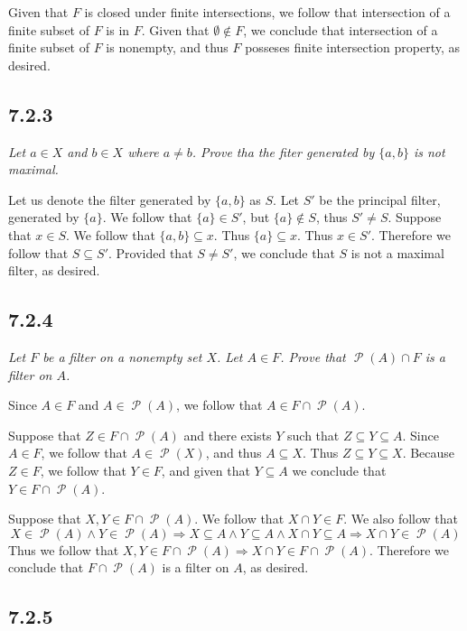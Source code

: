 \documentclass[11pt,oneside,titlepage]{book}
\DeclareMathOperator \pow {\mathcal {P}}
\DeclareMathOperator \ra {\Rightarrow}
\newcommand{\set}[1]{\{ #1 \}}
\begin{document}
Given that $F$ is closed under finite intersections, we follow that intersection of
a finite subset of $F$ is in $F$. Given that $\emptyset \notin F$, we conclude that
intersection of a finite subset of $F$ is nonempty, and thus $F$ posseses finite
intersection property, as desired.

\subsection*{7.2.3}

\textit{Let $a \in X$ and $b \in X$ where $a \neq b$. Prove tha the fiter generated by
  $\set{a, b}$ is not maximal.}

Let us denote the filter generated by $\set{a, b}$ as $S$.
Let $S'$ be the principal filter, generated by $\set{a}$. We follow that $\set{a} \in S'$,
but $\set{a} \notin S$, thus $S' \neq S$. Suppose that $x \in S$. We follow that
$\set{a, b} \subseteq x$. Thus $\set{a} \subseteq x$. Thus $x \in S'$. Therefore we follow that
$S \subseteq S'$. Provided that $S \neq S'$, we conclude that $S$ is not a maximal filter, as
desired.

\subsection*{7.2.4}

\textit{Let $F$ be a filter on a nonempty set $X$. Let $A \in F$. Prove that $\pow(A) \cap F$
  is a filter on $A$.}

Since $A \in F$ and $A \in \pow(A)$, we follow that $A \in F \cap \pow(A)$.

Suppose that $Z \in F \cap \pow(A)$ and there exists $Y$ such that
$Z \subseteq Y \subseteq A$. Since $A \in F$, we follow
that $A \in \pow(X)$, and thus $A \subseteq X$. Thus $Z \subseteq Y \subseteq X$.
Because $Z \in F$, we follow that $Y \in F$, and given that $Y \subseteq A$ we conclude that
$Y \in F \cap \pow(A)$.

Suppose that $X, Y \in F \cap \pow(A)$. We follow that $X \cap Y \in F$. We also follow that
$$X \in \pow(A) \land Y \in \pow(A) \ra
X \subseteq A \land Y \subseteq A \land X \cap Y \subseteq A \ra
X \cap Y \in \pow(A)$$
Thus we follow that $X, Y \in F \cap \pow(A) \ra X \cap Y \in F \cap \pow(A)$. Therefore we
conclude that $F \cap \pow(A)$ is a filter on $A$, as desired.

\subsection*{7.2.5}
\end{document}
